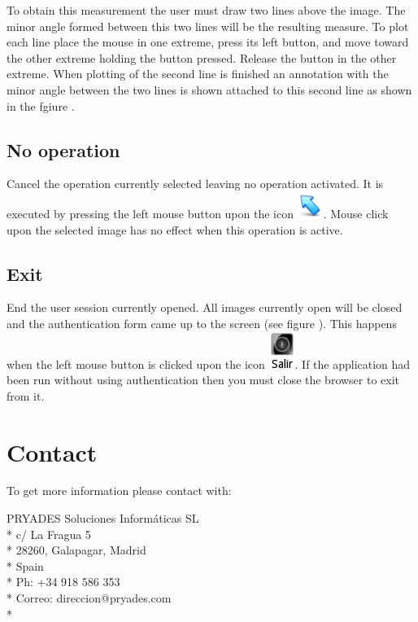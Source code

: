 \documentclass{plantilla-manual-usuario-en}
\begin{document}
To obtain this measurement the user must draw two lines above the image. The minor angle formed between this two lines will be the resulting measure. To plot each line place the mouse in one extreme, press its left button, and move toward the other extreme holding the button pressed. Release the button in the other extreme. When plotting of the second line is finished an annotation with the minor angle between the two lines is shown attached to this second line as shown in the fgiure .

\subsection{No operation}

Cancel the operation currently selected leaving no operation activated. It is executed by pressing the left mouse button upon the icon \includegraphics[scale=0.5]{images/cursor.png}. Mouse click upon the selected image has no 
effect when this operation is active.

\subsection{Exit}

End the user session currently opened. All images currently open will be closed and the authentication form came up to the screen (see figure ). This happens when the left mouse button is clicked upon the icon \includegraphics[scale=0.5]{images/exit.png}. If the application had been run without using authentication then you must close the browser to exit from it.

\clearpage

\section{Contact}

To get more information please contact with:

PRYADES Soluciones Informáticas SL\\*
c/ La Fragua 5\\*
28260, Galapagar, Madrid\\*
Spain\\*
Ph: +34 918 586 353\\*
Correo: direccion@pryades.com\\*
\end{document}
